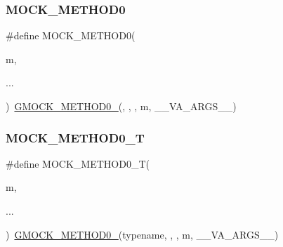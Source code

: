 \mbox{\label{_obj__test_2lib_2googletest-release-1_88_81_2googlemock_2include_2gmock_2gmock-generated-function-mockers_8h_a411c69e9d489d590480f728d365ae450}} 
\subsubsection{\texorpdfstring{MOCK\_METHOD0}{MOCK\_METHOD0}}
{\footnotesize\ttfamily \#define M\+O\+C\+K\+\_\+\+M\+E\+T\+H\+O\+D0(\begin{DoxyParamCaption}\item[{}]{m,  }\item[{}]{... }\end{DoxyParamCaption})~\mbox{\hyperlink{_obj__test_2lib_2googletest-release-1_88_81_2googlemock_2include_2gmock_2gmock-generated-function-mockers_8h_ae0d290ffa58d7c624b2e3487ba1252f4}{G\+M\+O\+C\+K\+\_\+\+M\+E\+T\+H\+O\+D0\+\_\+}}(, , , m, \+\_\+\+\_\+\+V\+A\+\_\+\+A\+R\+G\+S\+\_\+\+\_\+)}

\mbox{\label{_obj__test_2lib_2googletest-release-1_88_81_2googlemock_2include_2gmock_2gmock-generated-function-mockers_8h_a55a5a1a22cec416ead5605a2da39eec8}} 
\subsubsection{\texorpdfstring{MOCK\_METHOD0\_T}{MOCK\_METHOD0\_T}}
{\footnotesize\ttfamily \#define M\+O\+C\+K\+\_\+\+M\+E\+T\+H\+O\+D0\+\_\+T(\begin{DoxyParamCaption}\item[{}]{m,  }\item[{}]{... }\end{DoxyParamCaption})~\mbox{\hyperlink{_obj__test_2lib_2googletest-release-1_88_81_2googlemock_2include_2gmock_2gmock-generated-function-mockers_8h_ae0d290ffa58d7c624b2e3487ba1252f4}{G\+M\+O\+C\+K\+\_\+\+M\+E\+T\+H\+O\+D0\+\_\+}}(typename, , , m, \+\_\+\+\_\+\+V\+A\+\_\+\+A\+R\+G\+S\+\_\+\+\_\+)}

